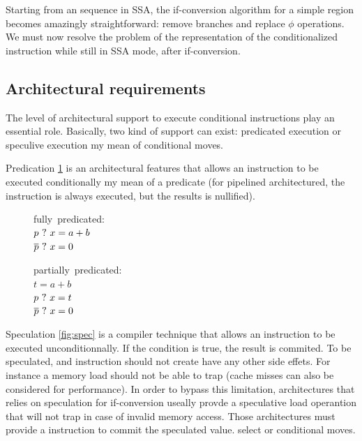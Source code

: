 Starting from an sequence in SSA, the if-conversion algorithm for a simple region becomes amazingly straightforward: remove branches and replace $\phi$ operations. We must now resolve the problem of the representation of the conditionalized instruction while still in SSA mode, after if-conversion. 

\subsection{Architectural requirements}
The level of architectural support to execute conditional instructions play an essential role. Basically, two kind of support can exist: predicated execution or  speculive execution my mean of conditional moves.

Predication \ref{fig:pred} is an architectural features that allows an instruction to be executed conditionally my mean of a predicate (for pipelined architectured, the instruction is always executed, but the results is nullified). 

\begin{figure}
\begin{minipage}[t]{4cm}
\mbox{fully predicated:} \\
$ p ~?~ x = a + b $ \\
$ \overline{p} ~?~ x = 0 $ \\
\end{minipage}
\begin{minipage}[t]{4cm}
\mbox{partially predicated:} \\
$t = a + b $ \\
$p ~?~ x = t $ \\
$\overline{p} ~?~ x = 0 $ \\
\end{minipage}
\label{fig:pred}
\end{figure}

Speculation \ref{fig:spec} is a compiler technique that allows an instruction to be executed unconditionnally. If the condition is true, the result is commited. To be speculated, and instruction should not create have any other side effets. For instance a memory load should not be able to trap (cache misses can also be considered for performance). In order to bypass this limitation, architectures that relies on speculation for if-conversion useally provde a speculative load operantion that will not trap in case of invalid memory access. Those architectures must provide a instruction to commit the speculated value. select or conditional moves.

